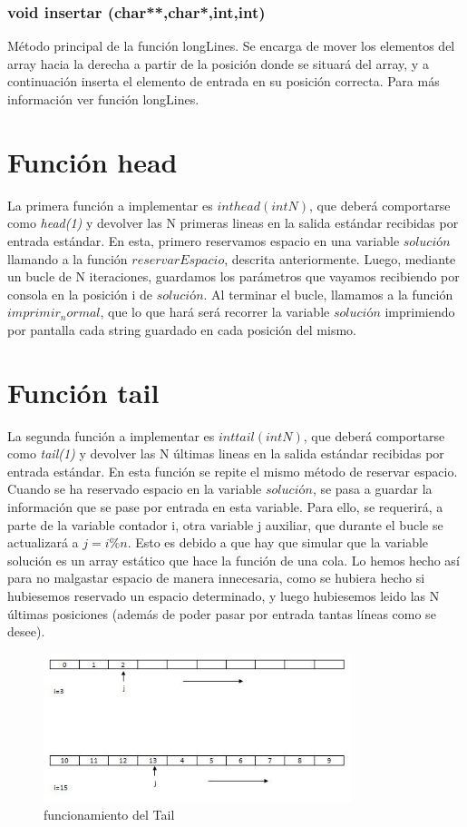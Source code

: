 \subsubsection{void insertar (char**,char*,int,int)}
Método principal de la función longLines. Se encarga de mover los elementos del array hacia la derecha a partir de la posición donde se situará  del array, y a continuación inserta el elemento de entrada en su posición correcta. Para más información ver función longLines. 
\section{Función head}
La primera función a implementar es $int head(int N)$, que deberá comportarse como \textit{head(1)} y devolver las N primeras lineas en la salida estándar recibidas por entrada estándar.
En esta, primero reservamos espacio en una variable $solución$ llamando a la función $reservarEspacio$, descrita anteriormente. Luego, mediante un bucle de N iteraciones, guardamos los parámetros que vayamos recibiendo por consola en la posición i de $solución$.
Al terminar el bucle, llamamos a la función $imprimir_normal$, que lo que hará será recorrer la variable $solución$ imprimiendo por pantalla cada string guardado en cada posición del mismo.
\section{Función tail}
La segunda función a implementar es $int tail(int N)$, que deberá comportarse como \textit{tail(1)} y devolver las N últimas lineas en la salida estándar recibidas por entrada estándar.
En esta función se repite el mismo método de reservar espacio. Cuando se ha reservado espacio en la variable $solución$, se pasa a guardar la información que se pase por entrada en esta variable. Para ello, se requerirá, a parte de la variable contador i, otra variable j auxiliar, que durante el bucle se actualizará a $j=i\%n$. Esto es debido a que hay que simular que la variable solución es un array estático que hace la función de una cola. Lo hemos hecho así para no malgastar espacio de manera innecesaria, como se hubiera hecho si hubiesemos reservado un espacio determinado, y luego hubiesemos leido las N últimas posiciones (además de poder pasar por entrada tantas líneas como se desee).
\begin{figure}[htb]
\begin{center}
\centering
  \includegraphics[width=0.8\textwidth]{./img_1}
  \caption{funcionamiento del Tail}
  \label{fig:Funcionamiento del Tail}
\end{center}
\end{figure} 

